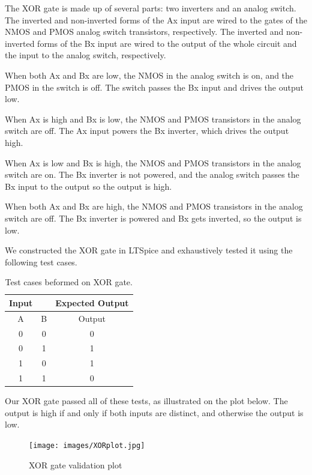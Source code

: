 \documentclass{article}
\begin{document}
The XOR gate is made up of several parts: two inverters and an analog switch. The inverted and non-inverted forms of the Ax input are wired to the gates of the NMOS and PMOS analog switch transistors, respectively. The inverted and non-inverted forms of the Bx input are wired to the output of the whole circuit and the input to the analog switch, respectively.

When both Ax and Bx are low, the NMOS in the analog switch is on, and the PMOS in the switch is off. The switch passes the Bx input and drives the output low.

When Ax is high and Bx is low,  the NMOS and PMOS transistors in the analog switch are off. The Ax input powers the Bx inverter, which drives the output high. 

When Ax is low and Bx is high, the NMOS and PMOS transistors in the analog switch are on. The Bx inverter is not powered, and the analog switch passes the Bx input to the output so the output is high.

When both Ax and Bx are high, the NMOS and PMOS transistors in the analog switch are off. The Bx inverter is powered and Bx gets inverted, so the output is low.

We constructed the XOR gate in LTSpice and exhaustively tested it using the following test cases.
\begin{table}[H]
\begin{center}
 \begin{tabular}{|c c | c |} 
 \hline  
Input &  & Expected Output \\
 \hline
 A & B & Output\\ 
 \hline
 0 & 0 & 0 \\ 
 \hline
 0 & 1 & 1 \\ 
 \hline
 1 & 0 & 1 \\ 
 \hline
 1 & 1 & 0 \\ 
 \hline
\end{tabular}
\caption{Test cases beformed on XOR gate.}
\end{center}
\end{table}
Our XOR gate passed all of these tests, as illustrated on the plot below. The output is high if and only if both inputs are distinct, and otherwise the output is low. 

\begin{figure}[H]
  \begin{center}      
  \texttt{[image: images/XORplot.jpg]}
  \caption{XOR gate validation plot}   
  \label{fig:XORplot}
  \end{center}
\end{figure}
\end{document}
